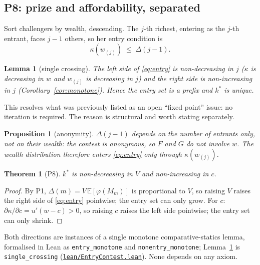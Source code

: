 \documentclass[11pt]{article}
\newtheorem{proposition}{Proposition}
\newtheorem{theorem}{Theorem}
\newtheorem{lemma}{Lemma}
\newcommand{\file}[1]{\href{run:#1}{\texttt{#1}}}
\begin{document}
\subsection{P8: prize and affordability, separated}
\label{prop:P8}

Sort challengers by wealth, descending. The $j$-th richest, entering as
the $j$-th entrant, faces $j-1$ others, so her entry condition is
\begin{equation}
  \kappa(w_{(j)}) \;\le\; \Delta(j-1).
  \label{eq:entry}
\end{equation}

\begin{lemma}[single crossing]
\label{lem:crossing}
The left side of \eqref{eq:entry} is non-decreasing in $j$ ($\kappa$ is
decreasing in $w$ and $w_{(j)}$ is decreasing in $j$) and the right side
is non-increasing in $j$ (Corollary~\ref{cor:monotone}). Hence the entry
set is a prefix and $k^*$ is unique.
\end{lemma}

This resolves what was previously listed as an open ``fixed point''
issue: no iteration is required. The reason is structural and worth
stating separately.

\begin{proposition}[anonymity]
\label{prop:anon}
$\Delta(j-1)$ depends on the \emph{number} of entrants only, not on
their wealth: the contest is anonymous, so $F$ and $G$ do not involve
$w$. The wealth distribution therefore enters \eqref{eq:entry} only
through $\kappa(w_{(j)})$.
\end{proposition}

\begin{theorem}[P8]
$k^*$ is non-decreasing in $V$ and non-increasing in $c$.
\end{theorem}
\begin{proof}
By P1, $\Delta(m)=V\,\mathbb E[\varphi(M_m)]$ is proportional to $V$, so
raising $V$ raises the right side of \eqref{eq:entry} pointwise; the
entry set can only grow. For $c$: $\partial\kappa/\partial c =
u'(w-c)>0$, so raising $c$ raises the left side pointwise; the entry set
can only shrink.
\end{proof}

Both directions are instances of a single monotone comparative-statics
lemma, formalised in Lean as \texttt{entry\_monotone} and
\texttt{nonentry\_monotone}; Lemma~\ref{lem:crossing} is
\texttt{single\_crossing} (\file{lean/EntryContest.lean}). None depends
on any axiom.
\end{document}
